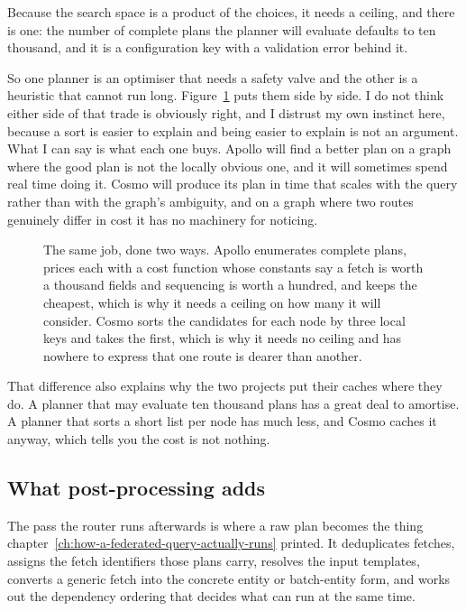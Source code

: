 Because the search space is a product of the choices, it needs a ceiling, and
there is one: the number of complete plans the planner will evaluate defaults to
ten thousand, and it is a configuration key with a validation error behind it.

%
So one planner is an optimiser that needs a safety valve and the other is a
heuristic that cannot run long.
Figure~\ref{fig:ch17-two-planners} puts them side by side. I do not think either
side of that trade is obviously right, and I distrust my own instinct here,
because a sort is easier to explain and being easier to explain is not an
argument. What I can say is what each one buys. Apollo will find a better plan
on a graph where the good plan is not the locally obvious one, and it will
sometimes spend real time doing it. Cosmo will produce its plan in time that
scales with the query rather than with the graph's ambiguity, and on a graph
where two routes genuinely differ in cost it has no machinery for noticing.

\begin{figure}[htbp]
  \centering
  
  \caption{The same job, done two ways. Apollo enumerates complete plans, prices
  each with a cost function whose constants say a fetch is worth a thousand
  fields and sequencing is worth a hundred, and keeps the cheapest, which is why
  it needs a ceiling on how many it will consider. Cosmo sorts the candidates
  for each node by three local keys and takes the first, which is why it needs
  no ceiling and has nowhere to express that one route is dearer than another.}
  \label{fig:ch17-two-planners}
\end{figure}

That difference also explains why the two projects put their caches where they
do. A planner that may evaluate ten thousand plans has a great deal to amortise.
A planner that sorts a short list per node has much less, and Cosmo caches it
anyway, which tells you the cost is not nothing.

\subsection*{What post-processing adds}

%
The pass the router runs afterwards is where a raw plan becomes the thing
chapter~\ref{ch:how-a-federated-query-actually-runs} printed. It deduplicates
fetches, assigns the fetch identifiers those plans carry, resolves the input
templates, converts a generic fetch into the concrete entity or batch-entity
form, and works out the dependency ordering that decides what can run at the
same time.

